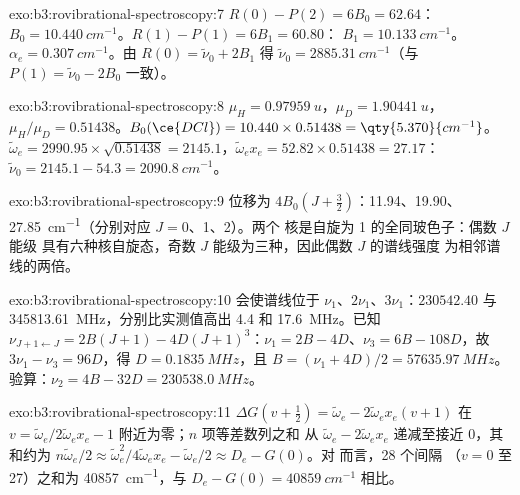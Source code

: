 \begin{solution}{exo:b3:rovibrational-spectroscopy:7}
$R(0) - P(2) = 6B_0 = 62.64$：$B_0 = \qty{10.440}{cm^{-1}}$。$R(1) - P(1) = 6B_1 = 60.80$：
$B_1 = \qty{10.133}{cm^{-1}}$。$\alpha_e = \qty{0.307}{cm^{-1}}$。由 $R(0) = \tilde\nu_0 + 2B_1$ 得
$\tilde\nu_0 = \qty{2885.31}{cm^{-1}}$（与 $P(1) = \tilde\nu_0 - 2B_0$ 一致）。
\end{solution}

\begin{solution}{exo:b3:rovibrational-spectroscopy:8}
$\mu_H = \qty{0.97959}{u}$，$\mu_D = \qty{1.90441}{u}$，$\mu_H/\mu_D = 0.51438$。$B_0(\ce{DCl})
= 10.440 \times 0.51438 = \qty{5.370}{cm^{-1}}$。$\tilde\omega_e = 2990.95 \times \sqrt{0.51438}
= 2145.1$，$\tilde\omega_ex_e = 52.82 \times 0.51438 = 27.17$：$\tilde\nu_0 = 2145.1 - 54.3 =
\qty{2090.8}{cm^{-1}}$。
\end{solution}

\begin{solution}{exo:b3:rovibrational-spectroscopy:9}
位移为 $4B_0(J + \frac32)$：11.94、19.90、\qty{27.85}{cm^{-1}}（分别对应 $J = 0$、1、2）。两个
 核是自旋为 1 的全同玻色子：偶数 $J$ 能级
具有六种核自旋态，奇数 $J$ 能级为三种，因此偶数 $J$ 的谱线强度
为相邻谱线的两倍。
\end{solution}

\begin{solution}{exo:b3:rovibrational-spectroscopy:10}
会使谱线位于 $\nu_1$、$2\nu_1$、$3\nu_1$：$230542.40$ 与
\qty{345813.61}{MHz}，分别比实测值高出 4.4 和 \qty{17.6}{MHz}。已知
$\nu_{J+1\leftarrow J} = 2B(J+1) - 4D(J+1)^3$：$\nu_1 = 2B - 4D$、$\nu_3 = 6B - 108D$，故
$3\nu_1 - \nu_3 = 96D$，得 $D = \qty{0.1835}{MHz}$，且 $B = (\nu_1 + 4D)/2 =
\qty{57635.97}{MHz}$。验算：$\nu_2 = 4B - 32D = \qty{230538.0}{MHz}$。
\end{solution}

\begin{solution}{exo:b3:rovibrational-spectroscopy:11}
$\Delta G(v + \frac12) = \tilde\omega_e - 2\tilde\omega_ex_e(v+1)$ 在 $v =
\tilde\omega_e/2\tilde\omega_ex_e - 1$ 附近为零；$n$ 项等差数列之和
从 $\tilde\omega_e - 2\tilde\omega_ex_e$ 递减至接近 0，其和约为 $n\tilde\omega_e/2 \approx
\tilde\omega_e^2/4\tilde\omega_ex_e - \tilde\omega_e/2 \approx D_e - G(0)$。对  而言，28 个间隔
（$v = 0$ 至 27）之和为 \qty{40857}{cm^{-1}}，与 $D_e - G(0) = \qty{40859}{cm^{-1}}$ 相比。
\end{solution}

